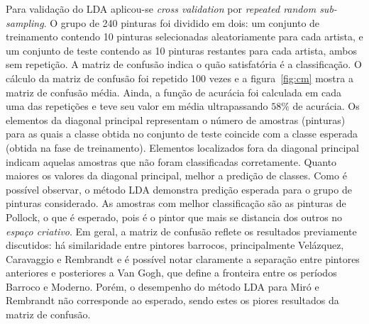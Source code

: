 Para validação do LDA aplicou-se \textit{cross validation}
por \textit{repeated random sub-sampling}. O grupo de 240 pinturas foi
dividido em dois: um conjunto de treinamento contendo 10 pinturas
selecionadas aleatoriamente para cada artista, e um conjunto de teste
contendo as 10 pinturas restantes para cada artista, ambos sem
repetição. A matriz de confusão indica o quão satisfatória é a
classificação. O cálculo da matriz de confusão foi repetido 100 vezes
e a figura~\ref{fig:cm} mostra a matriz de confusão média. Ainda, a
função de acurácia foi calculada em cada uma das repetições e teve seu
valor em média ultrapassando $58\%$ de acurácia. Os elementos da
diagonal principal representam o número de amostras (pinturas) para as
quais a classe obtida no conjunto de teste coincide com a classe
esperada (obtida na fase de treinamento). Elementos localizados fora
da diagonal principal indicam aquelas amostras que não foram
classificadas corretamente. Quanto maiores os valores
da diagonal principal, melhor a predição de classes. Como é possível
observar, o método LDA demonstra predição esperada para o grupo de
pinturas considerado. As amostras com melhor classificação são as
pinturas de Pollock, o que é esperado, pois é o pintor que mais se
distancia dos outros no \textit{espaço criativo}. Em geral, a matriz
de confusão reflete os resultados previamente discutidos: há
similaridade entre pintores barrocos, principalmente Velázquez,
Caravaggio e Rembrandt e é possível notar claramente a separação entre
pintores anteriores e posteriores a Van Gogh, que define a fronteira
entre os períodos Barroco e Moderno. Porém, o desempenho do método LDA para Miró e Rembrandt não corresponde ao esperado, sendo estes
os piores resultados da matriz de confusão.

